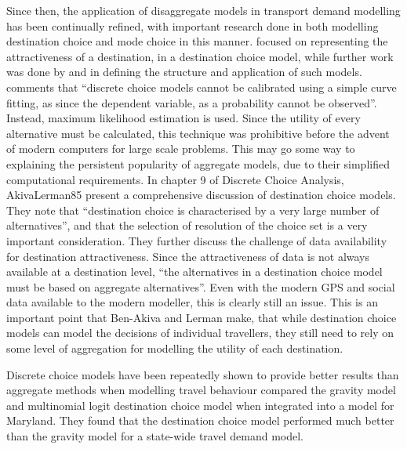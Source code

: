 Since then, the application of disaggregate models in transport demand modelling has been continually refined, with important research done in both modelling destination choice and mode choice in this manner. \textcite{Daly82} focused on representing the attractiveness of a destination, in a destination choice model, while further work was done by \textcite{Akiva74} and \textcite{Anas81} in defining the structure and application of such models. \textcite{Train09} comments that \enquote{discrete choice models cannot be calibrated using a simple curve fitting, as since the dependent variable, as a probability cannot be observed}. Instead, maximum likelihood estimation is used. Since the utility of every alternative must be calculated, this technique was prohibitive before the advent of modern computers for large scale problems. This may go some way to explaining the persistent popularity of aggregate models, due to their simplified computational requirements.
In chapter 9 of Discrete Choice Analysis, {AkivaLerman85} present a comprehensive discussion of destination choice models. They note that \enquote{destination choice is characterised by a very large number of alternatives}, and that the selection of resolution of the choice set is a very important consideration. They further discuss the challenge of data availability for destination attractiveness. Since the attractiveness of data is not always available at a destination level, \enquote{the alternatives in a destination choice model must be based on aggregate alternatives}. Even with the modern GPS and social data available to the modern modeller, this is clearly still an issue. This is an important point that Ben-Akiva and Lerman make, that while destination choice models can model the decisions of individual travellers, they still need to rely on some level of aggregation for modelling the utility of each destination.

Discrete choice models have been repeatedly shown to provide better results than aggregate methods when modelling travel behaviour \parencite*{Stephanedes84, Mishra13} compared the gravity model and multinomial logit destination choice model when integrated into a model for Maryland. They found that the destination choice model performed much better than the gravity model for a state-wide travel demand model. 

